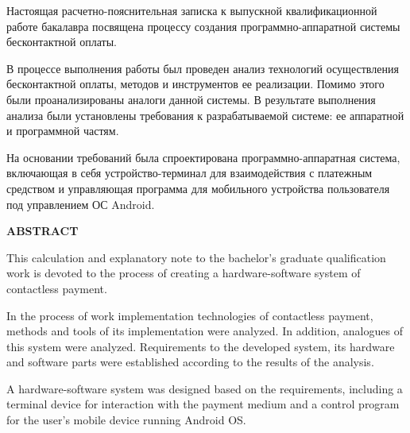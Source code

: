 \newpage


Настоящая расчетно-пояснительная записка к выпускной квалификационной работе бакалавра посвящена процессу создания программно-аппаратной системы бесконтактной оплаты.

В процессе выполнения работы был проведен анализ технологий осуществления бесконтактной оплаты, методов и инструментов ее реализации. 
Помимо этого были проанализированы аналоги данной системы.
В результате выполнения анализа были установлены требования к разрабатываемой системе: ее аппаратной и программной частям.

На основании требований была спроектирована программно-аппаратная система, включающая в себя устройство-терминал для взаимодействия с платежным средством и управляющая программа для мобильного устройства пользователя под управлением ОС Android.

\begin{center}
  \textbf{ABSTRACT}
\end{center}

This calculation and explanatory note to the bachelor's graduate qualification work is devoted to the process of creating a hardware-software system of contactless payment.

In the process of work implementation technologies of contactless payment, methods and tools of its implementation were analyzed. 
In addition, analogues of this system were analyzed.
Requirements to the developed system, its hardware and software parts were established according to the results of the analysis.

A hardware-software system was designed based on the requirements, including a terminal device for interaction with the payment medium and a control program for the user's mobile device running Android OS.